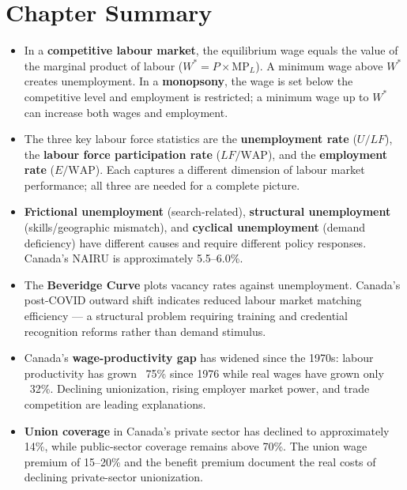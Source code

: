 \section*{Chapter Summary}

\begin{itemize}
  \item In a \textbf{competitive labour market}, the equilibrium wage equals
        the value of the marginal product of labour ($W^* = P \times \text{MP}_L$).
        A minimum wage above $W^*$ creates unemployment. In a
        \textbf{monopsony}, the wage is set below the competitive level and
        employment is restricted; a minimum wage up to $W^*$ can increase
        both wages and employment.

  \item The three key labour force statistics are the
        \textbf{unemployment rate} ($U/LF$), the
        \textbf{labour force participation rate} ($LF/\text{WAP}$), and the
        \textbf{employment rate} ($E/\text{WAP}$). Each captures a different
        dimension of labour market performance; all three are needed for a
        complete picture.

  \item \textbf{Frictional unemployment} (search-related), \textbf{structural
        unemployment} (skills/geographic mismatch), and \textbf{cyclical
        unemployment} (demand deficiency) have different causes and require
        different policy responses. Canada's NAIRU is approximately
        5.5--6.0\%.

  \item The \textbf{Beveridge Curve} plots vacancy rates against unemployment.
        Canada's post-COVID outward shift indicates reduced labour market
        matching efficiency --- a structural problem requiring training and
        credential recognition reforms rather than demand stimulus.

  \item Canada's \textbf{wage-productivity gap} has widened since the 1970s:
        labour productivity has grown ~75\% since 1976 while real wages
        have grown only ~32\%. Declining unionization, rising employer
        market power, and trade competition are leading explanations.

  \item \textbf{Union coverage} in Canada's private sector has declined
        to approximately 14\%, while public-sector coverage remains above
        70\%. The union wage premium of 15--20\% and the benefit premium
        document the real costs of declining private-sector unionization.


\end{itemize}
